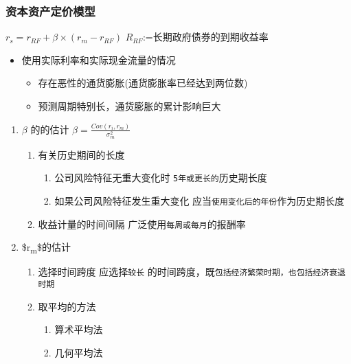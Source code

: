 \documentclass[11pt]{article}
\begin{document}
\subsubsection{资本资产定价模型}
\label{sec:org1bb7c74}
\(r_{s} = r_{RF} + \beta \times(r_{m} - r_{RF})\)
\(R_{RF}\):=长期政府债券的到期收益率
\begin{itemize}
\item 使用实际利率和实际现金流量的情况
\begin{itemize}
\item 存在恶性的通货膨胀(通货膨胀率已经达到两位数)
\item 预测周期特别长，通货膨胀的累计影响巨大
\end{itemize}
\end{itemize}
\begin{enumerate}
\item \(\beta\) 的的估计
\label{sec:org5f405a9}
\(\beta = \frac{Cov(r_{i},r_{m})}{\sigma_{m}^{2}}\)
\begin{enumerate}
\item 有关历史期间的长度
\begin{enumerate}
\item 公司风险特征无重大变化时
\texttt{5年或更长的}历史期长度
\item 如果公司风险特征发生重大变化
应当\texttt{使用变化后的年份}作为历史期长度
\end{enumerate}
\item 收益计量的时间间隔
广泛使用\texttt{每周或每月}的报酬率
\end{enumerate}
\item \$r\textsubscript{m}\$的估计
\label{sec:org8e3f515}
\begin{enumerate}
\item 选择时间跨度
应选择\texttt{较长} 的时间跨度，既\texttt{包括经济繁荣时期，也包括经济衰退时期}
\item 取平均的方法
\begin{enumerate}
\item 算术平均法
\item 几何平均法
\end{enumerate}
\end{enumerate}
\end{enumerate}
\end{document}
